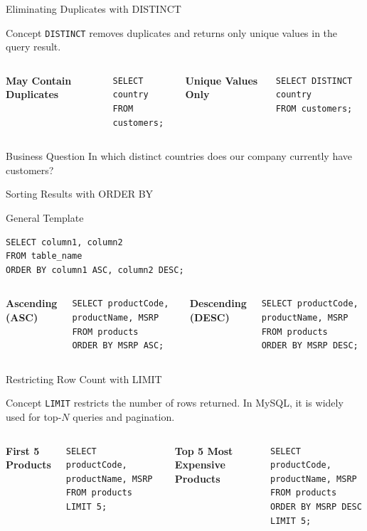 \documentclass[aspectratio=169,11pt]{beamer}
\newcommand{\kw}[1]{\textcolor{sqlblue}{\texttt{#1}}}
\newcommand{\minihead}[1]{\vspace{2pt}\textbf{#1}\vspace{2pt}}
\begin{document}
\begin{frame}[fragile]{Eliminating Duplicates with DISTINCT}
\begin{block}{Concept}
\kw{DISTINCT} removes duplicates and returns only unique values in the query result.
\end{block}
\begin{columns}[T]
\minihead{May Contain Duplicates}
\begin{lstlisting}
SELECT country
FROM customers;
\end{lstlisting}
\minihead{Unique Values Only}
\begin{lstlisting}
SELECT DISTINCT country
FROM customers;
\end{lstlisting}
\end{columns}
\begin{exampleblock}{Business Question}
In which distinct countries does our company currently have customers?
\end{exampleblock}
\end{frame}

\begin{frame}[fragile]{Sorting Results with ORDER BY}
\begin{block}{General Template}
\begin{lstlisting}
SELECT column1, column2
FROM table_name
ORDER BY column1 ASC, column2 DESC;
\end{lstlisting}
\end{block}
\begin{columns}[T]
\minihead{Ascending (ASC)}
\begin{lstlisting}
SELECT productCode, productName, MSRP
FROM products
ORDER BY MSRP ASC;
\end{lstlisting}
\minihead{Descending (DESC)}
\begin{lstlisting}
SELECT productCode, productName, MSRP
FROM products
ORDER BY MSRP DESC;
\end{lstlisting}
\end{columns}
\end{frame}

\begin{frame}[fragile]{Restricting Row Count with LIMIT}
\begin{block}{Concept}
\kw{LIMIT} restricts the number of rows returned. In MySQL, it is widely used for top-$N$ queries and pagination.
\end{block}
\begin{columns}[T]
\minihead{First 5 Products}
\begin{lstlisting}
SELECT productCode, productName, MSRP
FROM products
LIMIT 5;
\end{lstlisting}
\minihead{Top 5 Most Expensive Products}
\begin{lstlisting}
SELECT productCode, productName, MSRP
FROM products
ORDER BY MSRP DESC
LIMIT 5;
\end{lstlisting}
\end{columns}
\end{frame}
\end{document}
